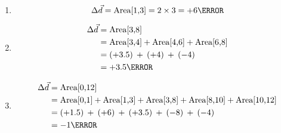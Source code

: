 \documentclass[12pt]{article} %
\begin{document}
\begin{qstn}[3]
        \begin{soln}
            \begin{enumerate}[label = (\alph*)]
                \item $$\Delta \vec d= \text{Area[1,3]} = 2 \times 3 = +6 \m$$
                \item 
                \begin{align*}
                    \Delta \vec d &= \text{Area[3,8]}  \\
                    &= \text{Area[3,4]} + \text{Area[4,6]} + \text{Area[6,8]}\\
                    &= (+3.5) \: + \:  (+4) \: + \: (-4)\\
                    &= +3.5\m
                \end{align*}
                \item 
                \begin{align*}
                    \Delta \vec d &= \text{Area[0,12]}\\
                    &= \text{Area[0,1]}  + \text{Area[1,3]}  + \text{Area[3,8]} + \text{Area[8,10]} +  \text{Area[10,12]}\\
                    &= (+1.5) \: + \: (+6) \: + \: (+3.5) \: + \: (-8) \: + \: (-4)\\
                    &= -1\m
                \end{align*}

            \end{enumerate}

        \end{soln}


 \end{qstn}
\end{document}
